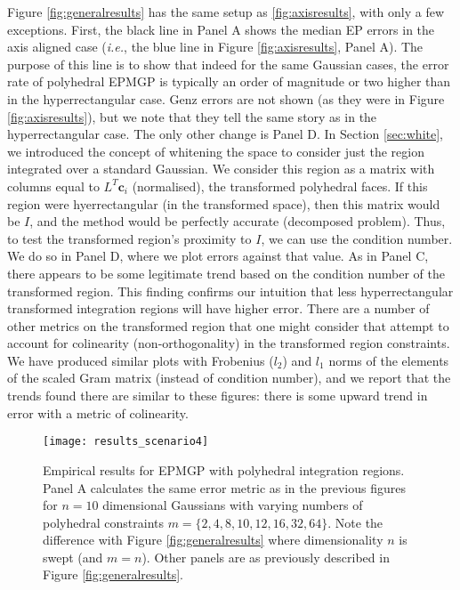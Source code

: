 \documentclass[twoside,11pt]{article}
\def\c{{\mathbf c}}
\begin{document}
Figure \ref{fig:generalresults} has the same setup as \ref{fig:axisresults}, with only a few exceptions.  First, the black line in Panel A shows the median EP errors in the axis aligned case ({\it i.e.}, the blue line in Figure \ref{fig:axisresults}, Panel A).  The purpose of this line is to show that indeed for the same Gaussian cases, the error rate of polyhedral EPMGP is typically an order of magnitude or two higher than in the hyperrectangular case.  Genz errors are not shown (as they were in Figure \ref{fig:axisresults}), but we note that they tell the same story as in the hyperrectangular case.  The only other change is Panel D.  In Section \ref{sec:white}, we introduced the concept of whitening the space to consider just the region integrated over a standard Gaussian.   We consider this region as a matrix with columns equal to $L^T\c_i$ (normalised), the transformed polyhedral faces.  If this region were hyerrectangular (in the transformed space), then this matrix would be $I$, and the method would be perfectly accurate (decomposed problem).  Thus, to test the transformed region's proximity to $I$, we can use the condition number.  We do so in Panel D, where we plot errors against that value.  As in Panel C, there appears to be some legitimate trend based on the condition number of the transformed region.  This finding confirms our intuition that less hyperrectangular transformed integration regions will have higher error.  There are a number of other metrics on the transformed region that one might consider that attempt to account for colinearity (non-orthogonality) in the transformed region constraints.  We have produced similar plots with Frobenius ($l_2$) and $l_1$ norms of the elements of the scaled Gram matrix (instead of condition number), and we report that the trends found there are similar to these figures: there is some upward trend in error with a metric of colinearity.
%
\begin{figure}
\centering
\hspace{0.0cm}
\texttt{[image: results\_scenario4]}
\caption{\small{Empirical results for EPMGP with polyhedral integration regions.  Panel A calculates the same error metric as in the previous figures for $n=10$ dimensional Gaussians with varying numbers of polyhedral constraints $m = \{2,4,8,10,12,16,32,64\}$.  Note the difference with Figure \ref{fig:generalresults} where dimensionality $n$ is swept (and $m=n$).  Other panels are as previously described in Figure \ref{fig:generalresults}.}}
\label{fig:generalresultspoly} %
\end{figure}
%
\end{document}

